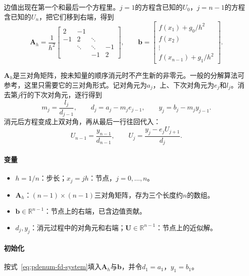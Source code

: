 边值出现在第一个和最后一个方程里。$j=1$的方程含已知的$U_0$，$j=n-1$的方程含已知的$U_n$，把它们移到右端，得到
\begin{equation}
 \bm{A}_h=\frac{1}{h^2}\begin{bmatrix}2&-1&&\\-1&2&\ddots&\\&\ddots&\ddots&-1\\&&-1&2\end{bmatrix},\qquad
 \bm{b}=\begin{bmatrix}f(x_1)+g_0/h^2\\f(x_2)\\\vdots\\f(x_{n-1})+g_1/h^2\end{bmatrix}.
 \label{eq:pdenum-fd-system}
\end{equation}

$\bm{A}_h$是三对角矩阵，按未知量的顺序消元时不产生新的非零元。一般的分解算法可参考，这里只需要它的三对角形式。记对角元为$a_j$，上、下次对角元为$e_j$和$l_j$。消去第$j$行的下次对角元，逐行得到
\begin{equation}
 m_j=\frac{l_j}{d_{j-1}},\qquad d_j=a_j-m_je_{j-1},\qquad y_j=b_j-m_jy_{j-1}.
 \label{eq:pdenum-thomas-forward}
\end{equation}
消元后方程变成上双对角，再从最后一行往回代入：
\begin{equation}
 U_{n-1}=\frac{y_{n-1}}{d_{n-1}},\qquad U_j=\frac{y_j-e_jU_{j+1}}{d_j}.
 \label{eq:pdenum-thomas-back}
\end{equation}

\paragraph{变量}
\begin{itemize}
 \item $h=1/n$：步长；$x_j=jh$：节点，$j=0,\ldots,n$。
 \item $\bm{A}_h$：$(n-1)\times(n-1)$三对角矩阵，存为三个长度约$n$的数组。
 \item $\bm{b}\in\mathbb{R}^{n-1}$：节点上的右端，已含边值贡献。
 \item $d_j,y_j$：消元过程中的对角元和右端；$\bm{U}\in\mathbb{R}^{n-1}$：节点上的近似解。
\end{itemize}

\paragraph{初始化}
按式~\eqref{eq:pdenum-fd-system}填入$\bm{A}_h$与$\bm{b}$，并令$d_1=a_1$，$y_1=b_1$。

